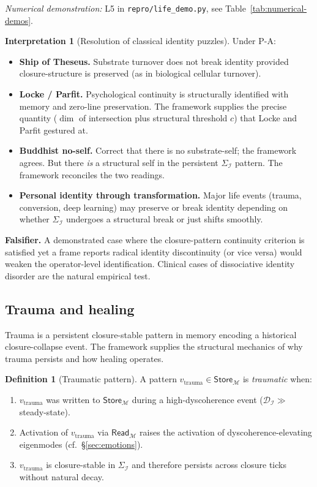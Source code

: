 \documentclass[11pt]{article}
\theoremstyle{plain}
\theoremstyle{definition}
\newtheorem{definition}[theorem]{Definition}
\newtheorem{interpretation}[theorem]{Interpretation}
\theoremstyle{remark}
\newcommand{\Ical}{\mathcal{I}}
\newcommand{\Mcal}{\mathcal{M}}
\newcommand{\Dcal}{\mathcal{D}}
\begin{document}
\noindent\emph{Numerical demonstration:} L5 in \texttt{repro/life\_demo.py}, see Table~\ref{tab:numerical-demos}.


\begin{interpretation}[Resolution of classical identity puzzles]\label{int:identity}
Under P-A:
\begin{itemize}[leftmargin=2em]
\item \textbf{Ship of Theseus.} Substrate turnover does not break identity provided closure-structure is preserved (as in biological cellular turnover).
\item \textbf{Locke / Parfit.} Psychological continuity is structurally identified with memory and zero-line preservation. The framework supplies the precise quantity ($\dim$ of intersection plus structural threshold $c$) that Locke and Parfit gestured at.
\item \textbf{Buddhist no-self.} Correct that there is no substrate-self; the framework agrees. But there \emph{is} a structural self in the persistent $\Sigma_\Ical$ pattern. The framework reconciles the two readings.
\item \textbf{Personal identity through transformation.} Major life events (trauma, conversion, deep learning) may preserve or break identity depending on whether $\Sigma_\Ical$ undergoes a structural break or just shifts smoothly.
\end{itemize}
\end{interpretation}

\textbf{Falsifier.} A demonstrated case where the closure-pattern continuity criterion is satisfied yet a frame reports radical identity discontinuity (or vice versa) would weaken the operator-level identification. Clinical cases of dissociative identity disorder are the natural empirical test.

\subsection{Trauma and healing}\label{sec:trauma}

Trauma is a persistent closure-stable pattern in memory encoding a historical closure-collapse event. The framework supplies the structural mechanics of why trauma persists and how healing operates.

\begin{definition}[Traumatic pattern]\label{def:trauma}
A pattern $v_{\mathrm{trauma}} \in \mathsf{Store}_\Mcal$ is \emph{traumatic} when:
\begin{enumerate}[leftmargin=2em]
\item $v_{\mathrm{trauma}}$ was written to $\mathsf{Store}_\Mcal$ during a high-dyscoherence event ($\Dcal_\Ical \gg$ steady-state).
\item Activation of $v_{\mathrm{trauma}}$ via $\mathsf{Read}_\Mcal$ raises the activation of dyscoherence-elevating eigenmodes (cf.\ \S\ref{sec:emotions}).
\item $v_{\mathrm{trauma}}$ is closure-stable in $\Sigma_\Ical$ and therefore persists across closure ticks without natural decay.
\end{enumerate}
\end{definition}
\end{document}
